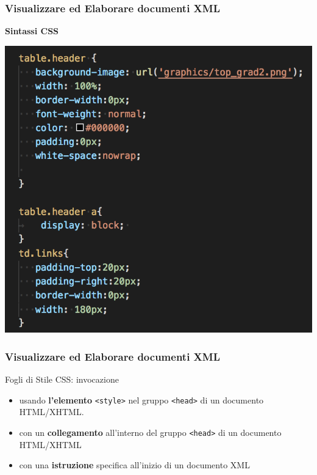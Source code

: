 \documentclass{beamer}
\begin{document}
    \begin{frame}
        \frametitle{Visualizzare ed Elaborare documenti XML}
        \addtocounter{nframe}{1}
        \begin{center}
            \textbf{Sintassi CSS}
        \end{center}
       
        \begin{center}
            \includegraphics[width=.9\textwidth]{imgs/css-sintassi.png}
        \end{center}
    
    \end{frame}

    \begin{frame}
        \frametitle{Visualizzare ed Elaborare documenti XML}
        \addtocounter{nframe}{1}
        \begin{block}{Fogli di Stile CSS: invocazione}
            
            \begin{itemize}
                \item usando \textbf{l’elemento} \texttt{<style>} nel gruppo \texttt{<head>} di un documento
                HTML/XHTML.
                \item con un \textbf{collegamento} all’interno del gruppo \texttt{<head>} di un documento HTML/XHTML
                \item con una \textbf{istruzione} specifica all’inizio di un documento XML
            \end{itemize}
         \end{block}
    
    \end{frame}
\end{document}
